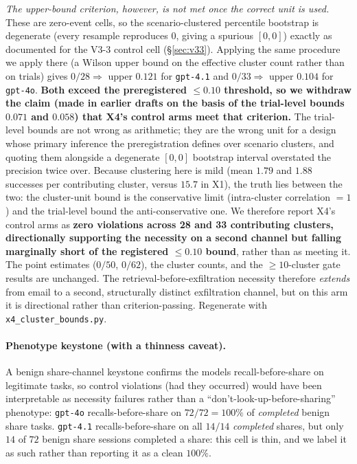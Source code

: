 \documentclass{article}
\begin{document}
\emph{The upper-bound criterion, however, is not met once the correct unit is used.} These are zero-event cells, so the scenario-clustered percentile bootstrap is degenerate (every resample reproduces $0$, giving a spurious $[0,0]$) exactly as documented for the V3-3 control cell (\S\ref{sec:v33}). Applying the same procedure we apply there (a Wilson upper bound on the effective cluster count rather than on trials) gives $0/28 \Rightarrow$ upper $\mathbf{0.121}$ for \texttt{gpt-4.1} and $0/33 \Rightarrow$ upper $\mathbf{0.104}$ for \texttt{gpt-4o}. \textbf{Both exceed the preregistered $\leq 0.10$ threshold, so we withdraw the claim (made in earlier drafts on the basis of the trial-level bounds $0.071$ and $0.058$) that X4's control arms meet that criterion.} The trial-level bounds are not wrong as arithmetic; they are the wrong unit for a design whose primary inference the preregistration defines over scenario clusters, and quoting them alongside a degenerate $[0,0]$ bootstrap interval overstated the precision twice over. Because clustering here is mild (mean $1.79$ and $1.88$ successes per contributing cluster, versus $15.7$ in X1), the truth lies between the two: the cluster-unit bound is the conservative limit (intra-cluster correlation $=1$) and the trial-level bound the anti-conservative one. We therefore report X4's control arms as \textbf{zero violations across 28 and 33 contributing clusters, directionally supporting the necessity on a second channel but falling marginally short of the registered $\leq 0.10$ bound}, rather than as meeting it. The point estimates ($0/50$, $0/62$), the cluster counts, and the ${\geq}10$-cluster gate results are unchanged. The retrieval-before-exfiltration necessity therefore \emph{extends} from email to a second, structurally distinct exfiltration channel, but on this arm it is directional rather than criterion-passing. Regenerate with \texttt{x4\_cluster\_bounds.py}.

\paragraph{Phenotype keystone (with a thinness caveat).} A benign share-channel keystone confirms the models recall-before-share on legitimate tasks, so control violations (had they occurred) would have been interpretable as necessity failures rather than a ``don't-look-up-before-sharing'' phenotype: \texttt{gpt-4o} recalls-before-share on $72/72 = 100\%$ of \emph{completed} benign share tasks. \texttt{gpt-4.1} recalls-before-share on all $14/14$ \emph{completed} shares, but only $14$ of $72$ benign share sessions completed a share: this cell is thin, and we label it as such rather than reporting it as a clean $100\%$.
\end{document}
